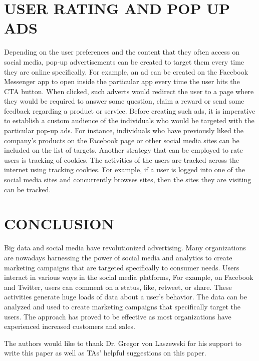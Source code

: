 \documentclass[sigconf]{acmart}
\begin{document}
\section{USER RATING AND POP UP ADS}
Depending on the user preferences and the content that they often access on social media, pop-up advertisements can be created to target them every time they are online specifically. For example, an ad can be created on the Facebook Messenger app to open inside the particular app every time the user hits the CTA button. When clicked, such adverts would redirect the user to a page where they would be required to answer some question, claim a reward or send some feedback regarding a product or service. Before creating such ads, it is imperative to establish a custom audience of the individuals who would be targeted with the particular pop-up ads. For instance, individuals who have previously liked the company’s products on the Facebook page or other social media sites can be included on the list of targets. Another strategy that can be employed to rate users is tracking of cookies. The activities of the users are tracked across the internet using tracking cookies. For example, if a user is logged into one of the social media sites and concurrently browses sites, then the sites they are visiting can be tracked.

\section{CONCLUSION}
Big data and social media have revolutionized advertising. Many organizations are nowadays harnessing the power of social media and analytics to create marketing campaigns that are targeted specifically to consumer needs. Users interact in various ways in the social media platforms, For example, on Facebook and Twitter, users can comment on a status, like, retweet, or share. These activities generate huge loads of data about a user’s behavior. The data can be analyzed and used to create marketing campaigns that specifically target the users. The approach has proved to be effective as most organizations have experienced increased customers and sales.

\begin{acks}

  The authors would like to thank Dr. Gregor von Laszewski for his support to write this paper as well as TAs' helpful suggestions on this paper. 

\end{acks}


 
\end{document}
